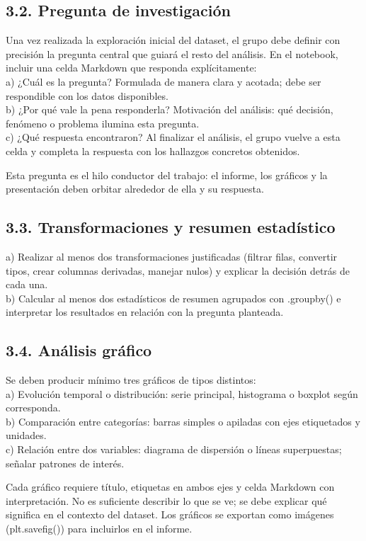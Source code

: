 \documentclass[10pt]{article}
\begin{document}
\subsection*{3.2. Pregunta de investigación}
Una vez realizada la exploración inicial del dataset, el grupo debe definir con precisión la pregunta central que guiará el resto del análisis. En el notebook, incluir una celda Markdown que responda explícitamente:\\
a) ¿Cuál es la pregunta? Formulada de manera clara y acotada; debe ser respondible con los datos disponibles.\\
b) ¿Por qué vale la pena responderla? Motivación del análisis: qué decisión, fenómeno o problema ilumina esta pregunta.\\
c) ¿Qué respuesta encontraron? Al finalizar el análisis, el grupo vuelve a esta celda y completa la respuesta con los hallazgos concretos obtenidos.

Esta pregunta es el hilo conductor del trabajo: el informe, los gráficos y la presentación deben orbitar alrededor de ella y su respuesta.

\subsection*{3.3. Transformaciones y resumen estadístico}
a) Realizar al menos dos transformaciones justificadas (filtrar filas, convertir tipos, crear columnas derivadas, manejar nulos) y explicar la decisión detrás de cada una.\\
b) Calcular al menos dos estadísticos de resumen agrupados con .groupby() e interpretar los resultados en relación con la pregunta planteada.

\subsection*{3.4. Análisis gráfico}
Se deben producir mínimo tres gráficos de tipos distintos:\\
a) Evolución temporal o distribución: serie principal, histograma o boxplot según corresponda.\\
b) Comparación entre categorías: barras simples o apiladas con ejes etiquetados y unidades.\\
c) Relación entre dos variables: diagrama de dispersión o líneas superpuestas; señalar patrones de interés.

Cada gráfico requiere título, etiquetas en ambos ejes y celda Markdown con interpretación. No es suficiente describir lo que se ve; se debe explicar qué significa en el contexto del dataset. Los gráficos se exportan como imágenes (plt.savefig()) para incluirlos en el informe.
\end{document}
